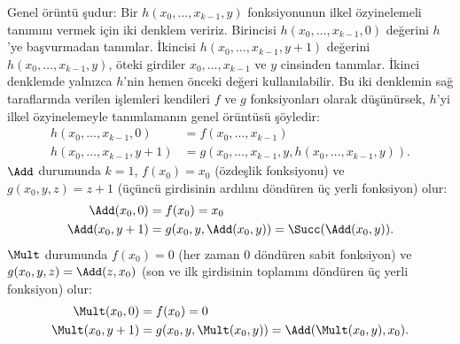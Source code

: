 Genel örüntü şudur: Bir $h(x_0,\dots,x_{k-1},y)$ fonksiyonunun ilkel
özyinelemeli tanımını vermek için iki denklem veririz. Birincisi
$h(x_0,\dots,x_{k-1},0)$ değerini $h$'ye başvurmadan tanımlar.
İkincisi $h(x_0,\dots,x_{k-1},y+1)$ değerini
$h(x_0,\dots,x_{k-1},y)$, öteki girdiler $x_0,\dots,x_{k-1}$ ve $y$
cinsinden tanımlar. İkinci denklemde yalnızca $h$'nin hemen önceki
değeri kullanılabilir. Bu iki denklemin sağ taraflarında verilen
işlemleri kendileri $f$ ve $g$ fonksiyonları olarak düşünürsek,
$h$'yi ilkel özyinelemeyle tanımlamanın genel örüntüsü şöyledir:
\begin{align*}
  h(x_0, \dots, x_{k-1}, 0) & = f(x_0, \dots, x_{k-1})\\
  h(x_0, \dots, x_{k-1}, y+1) & =
  g(x_0, \dots, x_{k-1}, y, h(x_0, \dots, x_{k-1}, y)).
\end{align*}
$\Add$ durumunda $k=1$, $f(x_0)=x_0$ (özdeşlik fonksiyonu) ve
$g(x_0,y,z)=z+1$ (üçüncü girdisinin ardılını döndüren üç yerli
fonksiyon) olur:
\begin{align*}
  \Add(x_0, 0) & = f(x_0) = x_0\\
  \Add(x_0, y+1) & = g(x_0, y, \Add(x_0, y)) =
  \Succ(\Add(x_0, y)).
\end{align*}
$\Mult$ durumunda $f(x_0)=0$ (her zaman $0$ döndüren sabit fonksiyon)
ve $g(x_0,y,z)=\Add(z,x_0)$ (son ve ilk girdisinin toplamını döndüren
üç yerli fonksiyon) olur:
\begin{align*}
  \Mult(x_0,0) & = f(x_0) = 0 \\
  \Mult(x_0,y+1) & = g(x_0, y, \Mult(x_0,y)) =
  \Add(\Mult(x_0,y), x_0).
\end{align*}

